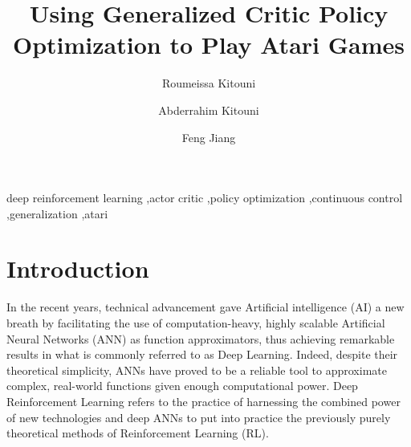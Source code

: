 \documentclass[review]{elsarticle}
\begin{document}
\begin{frontmatter}

\title{Using Generalized Critic Policy Optimization to Play Atari Games}

\author[hbn]{Roumeissa Kitouni}

\author[cne]{Abderrahim Kitouni}

\author[hbn]{Feng Jiang}

\address[hbn]{Harbin Institute of Technology, 92 Xidazhi Street, Nangang District, Harbin City, Heilongjiang Province, China}
\address[cne]{Université frères Mentouri Constantine 1, route d'Ain El Bey, 25017 Constantine, Algeria}

\begin{abstract}

\end{abstract}

\begin{keyword}
deep reinforcement learning \sep actor critic \sep policy optimization \sep continuous control \sep generalization \sep atari 
\end{keyword}

\end{frontmatter}

\section{Introduction}

In the recent years, technical advancement gave Artificial intelligence (AI) a new breath by facilitating the use of computation-heavy, highly scalable Artificial Neural Networks (ANN) as function approximators, thus achieving remarkable results in what is commonly referred to as Deep Learning. Indeed, despite their theoretical simplicity, ANNs have proved to be a reliable tool to approximate complex, real-world functions given enough computational power. Deep Reinforcement Learning refers to the practice of harnessing the combined power of new technologies and deep ANNs to put into practice the previously purely theoretical methods of Reinforcement Learning (RL). 
\end{document}
